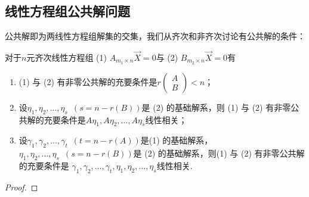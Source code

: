 \subsection{线性方程组公共解问题}
公共解即为两线性方程组解集的交集，我们从齐次和非齐次讨论有公共解的条件：
\begin{theorem}
    对于$n$元齐次线性方程组 (1) $A_{m_1 \times n}\vec{X}=0$与 (2) $B_{m_2 \times n}\vec{X}=0$有
    \begin{enumerate}
        \item (1) 与 (2) 有非零公共解的充要条件是$r\begin{pmatrix}
                A \\ B
            \end{pmatrix}<n$；

        \item 设$\eta_1,\eta_2,\ldots,\eta_s\enspace(s=n-r(B))$是 (2) 的基础解系，则
        (1) 与 (2) 有非零公共解的充要条件是$A\eta_1,A\eta_2,\ldots,A\eta_s$线性相关；

        \item 设$\gamma_1,\gamma_2,\ldots,\gamma_t\enspace(t=n-r(A))$是(1) 的基础解系，
        $\eta_1,\eta_2,\ldots,\eta_s\enspace(s=n-r(B))$是 (2) 的基础解系，则(1) 与 (2) 有非零公共解的充要条件是
        $\gamma_1,\gamma_2,\ldots,\gamma_t,\eta_1,\eta_2,\ldots,\eta_s$线性相关.
    \end{enumerate}
\end{theorem}
\begin{proof}
    
\end{proof}

